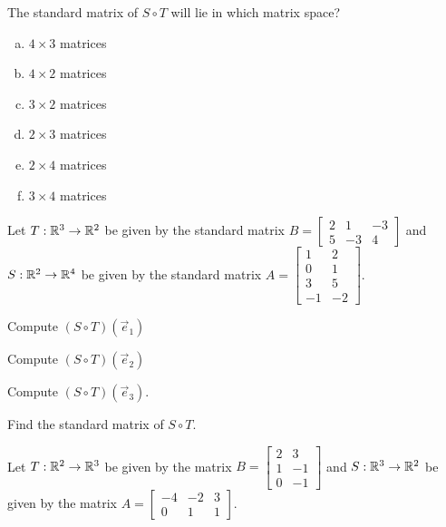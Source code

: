 \begin{applicationActivities}{1}{21}
\begin{activity}{2}
The standard matrix of $S \circ T$ will lie in which matrix space?
\begin{enumerate}[(a)]
\item $4 \times 3$ matrices
\item $4 \times 2$ matrices
\item $3 \times 2$ matrices
\item $2 \times 3$ matrices
\item $2 \times 4$ matrices
\item $3 \times 4$ matrices
\end{enumerate}
\end{activity}

\begin{activity}{15}
Let $T: \mathbb{R}^3 \rightarrow \mathbb{R}^2$ be given by the standard matrix $B=\begin{bmatrix} 2 & 1 & -3 \\ 5 & -3 & 4 \end{bmatrix}$ and $S: \mathbb{R}^2 \rightarrow \mathbb{R}^4$ be given by the standard matrix $A=\begin{bmatrix} 1 & 2 \\ 0 & 1 \\ 3 & 5 \\ -1 & -2 \end{bmatrix}$.

\begin{subactivity}
Compute $(S \circ T)(\vec{e}_1)$
\end{subactivity}
\begin{subactivity}
Compute  $(S \circ T)(\vec{e}_2)$
\end{subactivity}
\begin{subactivity}
Compute $(S \circ T)(\vec{e}_3)$.
\end{subactivity}
\begin{subactivity}
Find the standard matrix of $S \circ T$. 
\end{subactivity}
\end{activity}


\begin{activity}{2}
Let $T: \mathbb{R}^2 \rightarrow \mathbb{R}^3$ be given by the matrix $B=\begin{bmatrix} 2 & 3 \\ 1 & -1 \\ 0 & -1 \end{bmatrix}$ and $S: \mathbb{R}^3 \rightarrow \mathbb{R}^2$ be given by the matrix $A=\begin{bmatrix} -4 & -2 & 3 \\ 0 & 1 & 1 \end{bmatrix}$.


\end{activity}
\end{applicationActivities}
